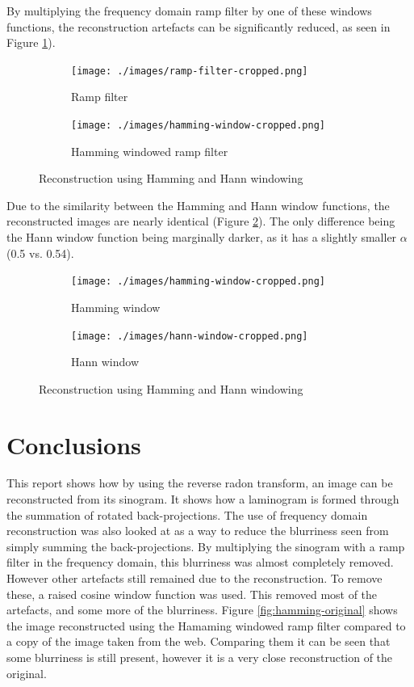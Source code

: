 \documentclass[12pt, a4paper]{article}
\begin{document}
	\noindent
	By multiplying the frequency domain ramp filter by one of these windows functions, the reconstruction artefacts can be significantly reduced, as seen in Figure \ref{fig:ramp-hamming}). 
	
	\begin{figure}[t]
		\centering
		\begin{subfigure}[t]{0.5\textwidth}
			\centering
			\texttt{[image: ./images/ramp-filter-cropped.png]}
			\caption{Ramp filter}
		\end{subfigure}%
		\begin{subfigure}[t]{0.5\textwidth}
			\centering
			\texttt{[image: ./images/hamming-window-cropped.png]}
			\caption{Hamming windowed ramp filter}
		\end{subfigure}
		\caption{Reconstruction using Hamming and Hann windowing}
		\label{fig:ramp-hamming}
	\end{figure}
	Due to the similarity between the Hamming and Hann window functions, the reconstructed images are nearly identical (Figure \ref{fig:hamm-hann}). The only difference being the Hann window function being marginally darker, as it has a slightly smaller $\alpha$ (0.5 vs. 0.54).
	
	\begin{figure}[h]
		\centering
		\begin{subfigure}[t]{0.5\textwidth}
			\centering
			\texttt{[image: ./images/hamming-window-cropped.png]}
			\caption{Hamming window}
		\end{subfigure}%
		\begin{subfigure}[t]{0.5\textwidth}
			\centering
			\texttt{[image: ./images/hann-window-cropped.png]}
			\caption{Hann window}
		\end{subfigure}
		\caption{Reconstruction using Hamming and Hann windowing}
		\label{fig:hamm-hann}
	\end{figure}
	
	\section*{Conclusions}
	This report shows how by using the reverse radon transform, an image can be reconstructed from its sinogram. It shows how a laminogram is formed through the summation of rotated back-projections. The use of frequency domain reconstruction was also looked at as a way to reduce the blurriness seen from simply summing the back-projections. By multiplying the sinogram with a ramp filter in the frequency domain, this blurriness was almost completely removed. However other artefacts still remained due to the reconstruction. To remove these, a raised cosine window function was used. This removed most of the artefacts, and some more of the blurriness. Figure \ref{fig:hamming-original} shows the image reconstructed using the Hamaming windowed ramp filter compared to a copy of the image taken from the web. Comparing them it can be seen that some blurriness is still present, however it is a very close reconstruction of the original.
	
\end{document}
